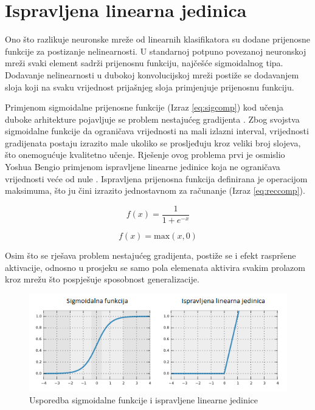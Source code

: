 \documentclass[lmodern, utf8, diplomski, numeric]{fer}
\begin{document}
\section{Ispravljena linearna jedinica}

Ono što razlikuje neuronske mreže od linearnih klasifikatora su dodane prijenosne funkcije za postizanje nelinearnosti. U standarnoj potpuno povezanoj neuronskoj mreži svaki element sadrži prijenosnu funkciju, najčešće sigmoidalnog tipa. Dodavanje nelinearnosti u dubokoj konvolucijskoj mreži postiže se dodavanjem sloja koji na svaku vrijednost prijašnjeg sloja primjenjuje prijenosnu funkciju. 

Primjenom sigmoidalne prijenosne funkcije (Izraz \ref{eq:sigcomp}) kod učenja duboke arhitekture pojavljuje se problem nestajućeg gradijenta  \cite{hochreiter2001vanish}. Zbog svojstva sigmoidalne funkcije da ograničava vrijednosti na mali izlazni interval, vrijednosti gradijenata postaju izrazito male ukoliko se prosljeđuju kroz veliki broj slojeva, što onemogućuje kvalitetno učenje. Rješenje ovog problema prvi je osmislio Yoshua Bengio primjenom ispravljene linearne jedinice  koja ne ograničava vrijednosti veće od nule \cite{bengio2011relu}. Ispravljena prijenosna funkcija definirana je operacijom maksimuma, što ju čini izrazito jednostavnom za računanje (Izraz \ref{eq:reccomp}).

\begin{equation}
f(x) = \frac{1}{1 + e^{-x}}
\label{eq:sigcomp}
\end{equation}

\begin{equation}
f(x) = \text{max}(x, 0)
\label{eq:reccomp}          
\end{equation}

\hspace{2em}

 Osim što se rješava problem nestajućeg gradijenta, postiže se i efekt raspršene aktivacije, odnosno u prosjeku se samo pola elemenata aktivira svakim prolazom kroz mrežu što pospješuje sposobnost generalizacije.  

\begin{figure}[ht!]
\centering
\includegraphics[width=15cm]{slike/sigmoid_relu.png}
\caption{Usporedba sigmoidalne funkcije i ispravljene linearne jedinice}
\end{figure}
\end{document}

